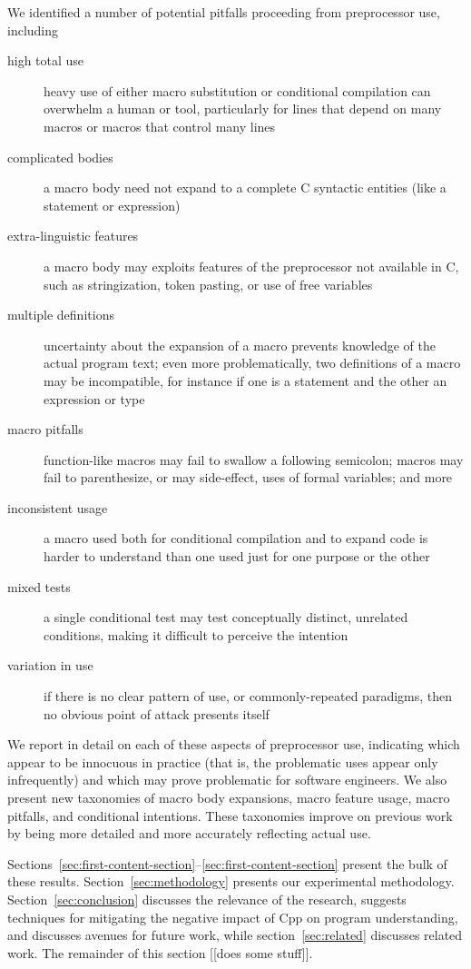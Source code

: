\documentclass[10pt]{article}
\begin{document}
We identified a number of potential pitfalls proceeding from preprocessor
use, including
\begin{description}
\item[high total use]  heavy use of either macro substitution or
  conditional compilation can overwhelm a human or tool, particularly for
  lines that depend on many macros or macros that control many lines
\item[complicated bodies]  a macro body need not expand to a complete
  C syntactic entities (like a statement or expression)
\item[extra-linguistic features]  a macro body may exploits features of
  the preprocessor not available in C, such as stringization, token
  pasting, or use of free variables
\item[multiple definitions]  uncertainty about the expansion of a macro
  prevents knowledge of the actual program text; even more problematically,
  two definitions of a macro may be incompatible, for instance if one is a
  statement and the other an expression or type
\item[macro pitfalls]  function-like macros may fail to swallow a following
  semicolon; macros may fail to parenthesize, or may side-effect, uses of
  formal variables; and more
\item[inconsistent usage]  a macro used both for conditional
  compilation and to expand code is harder to understand than one used just
  for one purpose or the other
\item[mixed tests]  a single conditional test may test conceptually
  distinct, unrelated conditions, making it difficult to perceive the
  intention
\item[variation in use]  if there is no clear pattern of use, or
  commonly-repeated paradigms, then no obvious point of attack presents
  itself
\end{description}
We report in detail on each of these aspects of preprocessor use,
indicating which appear to be innocuous in practice (that is, the
problematic uses appear only infrequently) and which may prove problematic
for software engineers.  We also present new taxonomies of macro body
expansions, macro feature usage, macro pitfalls, and conditional
intentions.  These taxonomies improve on previous work by being more
detailed and more accurately reflecting actual use.

Sections~\ref{sec:first-content-section}--\ref{sec:first-content-section}
present the bulk of these results.  Section~\ref{sec:methodology} presents
our experimental methodology.  Section~\ref{sec:conclusion} discusses the relevance of the research,
suggests techniques for mitigating the negative impact of Cpp on program
understanding, and discusses avenues for future work, while
section~\ref{sec:related} discusses related work.
The remainder of this section [[does some stuff]].
\end{document}
